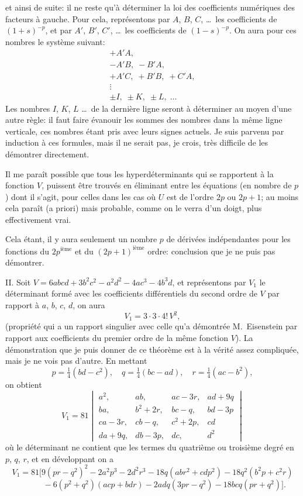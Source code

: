 \documentclass[11pt]{article}
\begin{document}
et ainsi de suite: il ne reste qu'\`a d\'eterminer la loi des coefficients num\'eriques des
facteurs \`a gauche. Pour cela, repr\'esentons par $A$, $B$, $C$, \ldots\ les coefficients de $(1 + s)^{-p}$, et
par $A'$, $B'$, $C'$, \ldots\ les coefficients de $(1 - s)^{-p}$. On aura pour ces nombres le syst\`eme
suivant:
\[
\begin{array}{c}
+ A'A,\\
- A'B,\; -B'A,\\
+ A'C,\; +B'B,\; +C'A,\\
\vdots\\
\pm I,\; \pm K,\; \pm L,\;\ldots
\end{array}
\]
Les nombres $I$, $K$, $L$ \ldots\ de la derni\`ere ligne seront \`a d\'eterminer au moyen d'une autre
r\`egle: il faut faire \'evanouir les sommes des nombres dans la m\^eme ligne verticale, ces
nombres \'etant pris avec leurs signes actuels. Je suis parvenu par induction \`a ces
formules, mais il ne serait pas, je crois, tr\`es difficile de les d\'emontrer directement.

\medskip
Il me para\^it possible que tous les hyperd\'eterminants qui se rapportent \`a la fonction
$V$, puissent \^etre trouv\'es en \'eliminant entre les \'equations (en nombre de $p$) dont il s'agit,
pour celles dans les cas o\`u $U$ est de l'ordre $2p$ ou $2p + 1$; au moins cela para\^it (a priori)
mais probable, comme on le verra d'un doigt, plus effectivement vrai.

\medskip
Cela \'etant, il y aura seulement un nombre $p$ de d\'eriv\'ees ind\'ependantes pour les
fonctions du $2 p^{\text{i\`eme}}$ et du $(2 p + 1)^{\text{i\`eme}}$ ordre: conclusion que je ne puis pas d\'emontrer.

\medskip
\noindent\textsc{II.} Soit $V = 6 a b c d + 3 b^{2} c^{2} - a^{2} d^{2} - 4 a c^{3} - 4 b^{3} d$, et repr\'esentons par $V_{1}$ le d\'eterminant
form\'e avec les coefficients diff\'erentiels du second ordre de $V$ par rapport \`a $a$, $b$, $c$, $d$,
on aura
\[
V_{1} = 3 \cdot 3 \cdot 4!\, V^{2},
\]
(propri\'et\'e qui a un rapport singulier avec celle qu'a d\'emontr\'ee M.~Eisenstein par rapport
aux coefficients du premier ordre de la m\^eme fonction $V$). La d\'emonstration que je puis
donner de ce th\'eor\`eme est \`a la v\'erit\'e assez compliqu\'ee, mais je ne vois pas d'autre.
En mettant
\[
p = \tfrac{1}{4}(b d - c^{2}), \quad q = \tfrac{1}{4}(b c - a d), \quad r = \tfrac{1}{4}(a c - b^{2}),
\]
on obtient
\[
V_{1} = 81\begin{vmatrix} a^{2}, & a b, & a c - 3 r, & a d + 9 q \\ b a, & b^{2} + 2 r, & b c - q, & b d - 3 p \\ c a - 3 r, & c b - q, & c^{2} + 2 p, & c d \\ d a + 9 q, & d b - 3 p, & d c, & d^{2} \end{vmatrix}
\]
o\`u le d\'eterminant ne contient que les termes du quatri\`eme ou troisi\`eme degr\'e en $p$, $q$, $r$,
et en d\'eveloppant on a
\[
V_{1} = 81[9(p r - q^{2})^{2} - 2 a^{2} p^{3} - 2 d^{2} r^{3} - 18 q (a b r^{2} + c d p^{2}) - 18 q^{2}(b^{2} p + c^{2} r)
\]
\[
\phantom{V_{1} =}\;\; - 6(p^{2} + q^{2})(a c p + b d r) - 2 a d q(3 p r - q^{2}) - 18 b c q(p r + q^{2})].
\]
\end{document}
